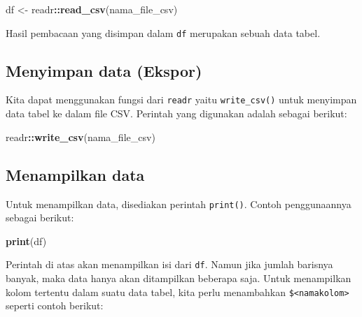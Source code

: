 \documentclass[]{book}
\newenvironment{Shaded}{\begin{snugshade}}{\end{snugshade}}
\newcommand{\KeywordTok}[1]{\textcolor[rgb]{0.13,0.29,0.53}{\textbf{#1}}}
\newcommand{\NormalTok}[1]{#1}
\newcommand{\OperatorTok}[1]{\textcolor[rgb]{0.81,0.36,0.00}{\textbf{#1}}}
\newcommand{\StringTok}[1]{\textcolor[rgb]{0.31,0.60,0.02}{#1}}
\begin{document}
\begin{Shaded}
\begin{Highlighting}[]
\NormalTok{df <-}\StringTok{ }\NormalTok{readr}\OperatorTok{::}\KeywordTok{read_csv}\NormalTok{(nama_file_csv)}
\end{Highlighting}
\end{Shaded}

Hasil pembacaan yang disimpan dalam \texttt{df} merupakan sebuah data
tabel.

\hypertarget{menyimpan-data-ekspor}{%
\subsection{Menyimpan data (Ekspor)}\label{menyimpan-data-ekspor}}

Kita dapat menggunakan fungsi dari \texttt{readr} yaitu
\texttt{write\_csv()} untuk menyimpan data tabel ke dalam file CSV.
Perintah yang digunakan adalah sebagai berikut:

\begin{Shaded}
\begin{Highlighting}[]
\NormalTok{readr}\OperatorTok{::}\KeywordTok{write_csv}\NormalTok{(nama_file_csv)}
\end{Highlighting}
\end{Shaded}

\hypertarget{menampilkan-data}{%
\subsection{Menampilkan data}\label{menampilkan-data}}

Untuk menampilkan data, disediakan perintah \texttt{print()}. Contoh
penggunaannya sebagai berikut:

\begin{Shaded}
\begin{Highlighting}[]
\KeywordTok{print}\NormalTok{(df)}
\end{Highlighting}
\end{Shaded}

Perintah di atas akan menampilkan isi dari \texttt{df}. Namun jika
jumlah barisnya banyak, maka data hanya akan ditampilkan beberapa saja.
Untuk menampilkan kolom tertentu dalam suatu data tabel, kita perlu
menambahkan \texttt{\$\textless{}namakolom\textgreater{}} seperti contoh
berikut:

\begin{Shaded}
\end{Shaded}
\end{document}

